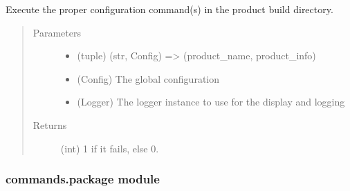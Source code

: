 \documentclass[a4paper,10pt,english]{sphinxmanual}
\begin{document}
\begin{fulllineitems}
\label{\detokenize{apidoc_commands/commands:commands.makeinstall.makeinstall_product}}
Execute the proper configuration command(s) 
in the product build directory.
\begin{quote}\begin{description}
\item[{Parameters}] \leavevmode\begin{itemize}
\item {} 
 \textendash{} (tuple) 
(str, Config) =\textgreater{} (product\_name, product\_info)

\item {} 
 \textendash{} (Config) The global configuration

\item {} 
 \textendash{} (Logger) 
The logger instance to use for the display and logging

\end{itemize}

\item[{Returns}] \leavevmode
(int) 1 if it fails, else 0.

\end{description}\end{quote}

\end{fulllineitems}



\subsubsection{commands.package module}
\label{\detokenize{apidoc_commands/commands:commands-package-module}}\label{\detokenize{apidoc_commands/commands:module-commands.package}}
\end{document}
